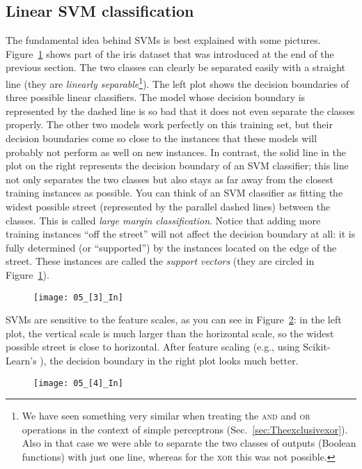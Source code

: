 \subsection{Linear SVM classification}
The fundamental idea behind SVMs is best explained with some pictures. Figure~\ref{05_[3]_In} shows part of the iris dataset that was introduced at the end of the previous section. The two classes can clearly be separated easily with a straight line (they are \emph{linearly separable}\footnote{We have seen something very similar when treating the \textsc{and} and \textsc{or} operations in the context of simple perceptrons (Sec.~\ref{sec:Theexclusivexor}). Also in that case we were able to separate the two classes of outputs (Boolean functions) with just one line, whereas for the \textsc{xor} this was not possible.}). The left plot shows the decision boundaries of three possible linear classifiers. The model whose decision boundary is represented by the dashed line is so bad that it does not even separate the classes properly. The other two models work perfectly on this training set, but their decision boundaries come so close to the instances that these models will probably not perform as well on new instances. In contrast, the solid line in the plot on the right represents the decision boundary of an SVM classifier; this line not only separates the two classes but also stays as far away from the closest training instances as possible. You can think of an SVM classifier as fitting the widest possible street (represented by the parallel dashed lines) between the classes. This is called \emph{large margin classification}. Notice that adding more training instances ``off the street'' will not affect the decision boundary at all: it is fully determined (or ``supported'') by the instances located on the edge of the street. These instances are called the \emph{support vectors} (they are circled in Figure~\ref{05_[3]_In}).
\begin{figure}[h!t]
\centering
\texttt{[image: 05\_[3]\_In]}
\caption{}\label{05_[3]_In}
\end{figure}

SVMs are sensitive to the feature scales, as you can see in Figure~\ref{05_[4]_In}: in the left plot, the vertical scale is much larger than the horizontal scale, so the widest possible street is close to horizontal. After feature scaling (e.g., using Scikit-Learn's ), the decision boundary in the right plot looks much better.
\begin{figure}[h!t]
\centering
\texttt{[image: 05\_[4]\_In]}
\caption{}\label{05_[4]_In}
\end{figure}
